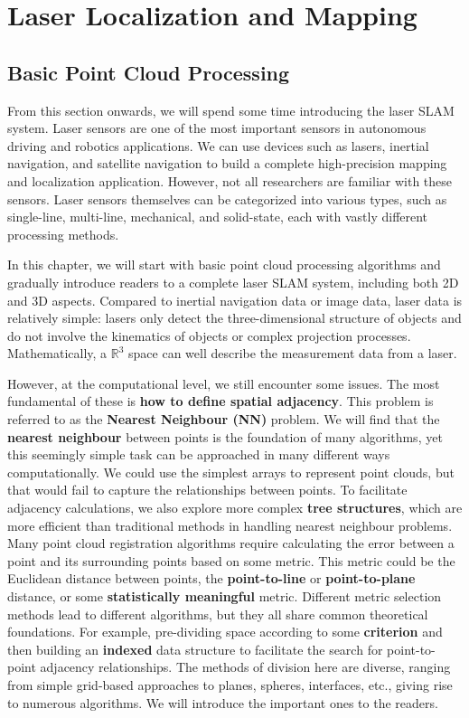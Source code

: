 \part{Laser Localization and Mapping}  
\thispagestyle{empty}  
\chapter{Basic Point Cloud Processing}  
\thispagestyle{empty}  

From this section onwards, we will spend some time introducing the laser SLAM system. Laser sensors are one of the most important sensors in autonomous driving and robotics applications. We can use devices such as lasers, inertial navigation, and satellite navigation to build a complete high-precision mapping and localization application. However, not all researchers are familiar with these sensors. Laser sensors themselves can be categorized into various types, such as single-line, multi-line, mechanical, and solid-state, each with vastly different processing methods.  

In this chapter, we will start with basic point cloud processing algorithms and gradually introduce readers to a complete laser SLAM system, including both 2D and 3D aspects. Compared to inertial navigation data or image data, laser data is relatively simple: lasers only detect the three-dimensional structure of objects and do not involve the kinematics of objects or complex projection processes. Mathematically, a $\mathbb{R}^3$ space can well describe the measurement data from a laser.  

However, at the computational level, we still encounter some issues. The most fundamental of these is \textbf{how to define spatial adjacency}. This problem is referred to as the \textbf{Nearest Neighbour (NN)} problem. We will find that the \textbf{nearest neighbour} between points is the foundation of many algorithms, yet this seemingly simple task can be approached in many different ways computationally. We could use the simplest arrays to represent point clouds, but that would fail to capture the relationships between points. To facilitate adjacency calculations, we also explore more complex \textbf{tree structures}, which are more efficient than traditional methods in handling nearest neighbour problems. Many point cloud registration algorithms require calculating the error between a point and its surrounding points based on some metric. This metric could be the Euclidean distance between points, the \textbf{point-to-line} or \textbf{point-to-plane} distance, or some \textbf{statistically meaningful} metric. Different metric selection methods lead to different algorithms, but they all share common theoretical foundations. For example, pre-dividing space according to some \textbf{criterion} and then building an \textbf{indexed} data structure to facilitate the search for point-to-point adjacency relationships. The methods of division here are diverse, ranging from simple grid-based approaches to planes, spheres, interfaces, etc., giving rise to numerous algorithms. We will introduce the important ones to the readers.  


